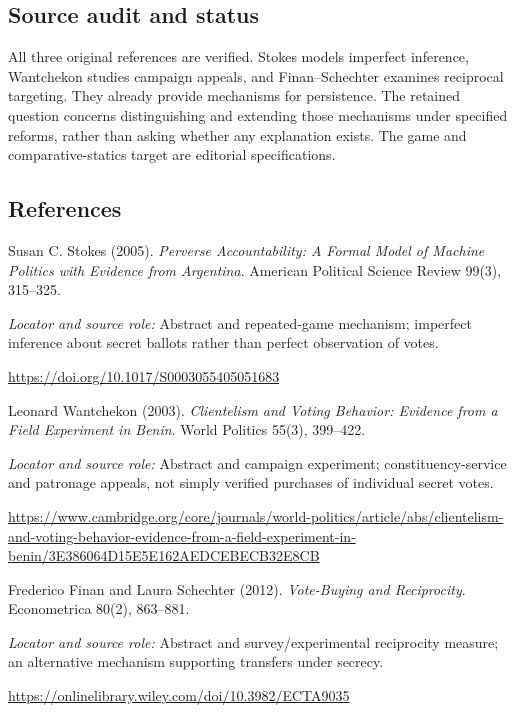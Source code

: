 \documentclass[11pt,a4paper]{article}
\begin{document}
\subsection*{Source audit and status}
All three original references are verified. Stokes models imperfect inference, Wantchekon studies campaign appeals, and Finan--Schechter examines reciprocal targeting. They already provide mechanisms for persistence. The retained question concerns distinguishing and extending those mechanisms under specified reforms, rather than asking whether any explanation exists. The game and comparative-statics target are editorial specifications.
\subsection*{References}
{\footnotesize\raggedright
\begin{enumerate}[label={\textbf{[S\arabic*]}},leftmargin=3em]
\item Susan C. Stokes (2005). \emph{Perverse Accountability: A Formal Model of Machine Politics with Evidence from Argentina}. American Political Science Review 99(3), 315--325.\par
\textit{Locator and source role:} Abstract and repeated-game mechanism; imperfect inference about secret ballots rather than perfect observation of votes.\par
\url{https://doi.org/10.1017/S0003055405051683}
\item Leonard Wantchekon (2003). \emph{Clientelism and Voting Behavior: Evidence from a Field Experiment in Benin}. World Politics 55(3), 399--422.\par
\textit{Locator and source role:} Abstract and campaign experiment; constituency-service and patronage appeals, not simply verified purchases of individual secret votes.\par
\url{https://www.cambridge.org/core/journals/world-politics/article/abs/clientelism-and-voting-behavior-evidence-from-a-field-experiment-in-benin/3E386064D15E5E162AEDCEBECB32E8CB}
\item Frederico Finan and Laura Schechter (2012). \emph{Vote-Buying and Reciprocity}. Econometrica 80(2), 863--881.\par
\textit{Locator and source role:} Abstract and survey/experimental reciprocity measure; an alternative mechanism supporting transfers under secrecy.\par
\url{https://onlinelibrary.wiley.com/doi/10.3982/ECTA9035}
\end{enumerate}
}
\end{document}
